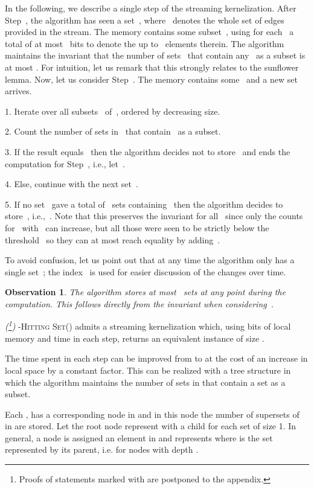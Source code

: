 \documentclass[draft,a4paper]{llncs}
\newtheorem{observation}{Observation}
\newcommand{\dHSk}{-\textsc{Hitting Set()}\xspace}
\begin{document}
In the following, we describe a single step of the streaming kernelization. After Step~, the algorithm has seen a set~, where~ denotes the whole set of edges provided in the stream. The memory contains some subset~, using for each~ a total of at most~ bits to denote the up to~ elements therein. The algorithm maintains the invariant that the number of sets~ that contain any~ as a subset is at most . For intuition, let us remark that this strongly relates to the sunflower lemma. Now, let us consider Step~. The memory contains some~ and a new set~ arrives.
\smallskip

1. Iterate over all subsets~ of~, ordered by decreasing size.

2. Count the number of sets in~ that contain~ as a subset.

3. If the result equals~ then the algorithm decides not to store~ and ends the computation for Step~, i.e., let~.
 
4. Else, continue with the next set~.
 
5. If no set~ gave a total of~ sets containing~ then the algorithm decides to store~, i.e.,~. Note that this preserves the invariant for all~ since only the counts for~ with~ can increase, but all those were seen to be strictly below the threshold~ so they can at most reach equality by adding~.

\smallskip
To avoid confusion, let us point out that at any time the algorithm only has a single set~; the index~ is used for easier discussion of the changes over time.

\begin{observation}\label{obs:dhs}
The algorithm stores at most~ sets at any point during the computation. This follows directly from the invariant when considering~.
\end{observation}

\begin{theorem}\label{thm:dhs} \emph{(\footnote{Proofs of statements marked with  are postponed to the appendix.})}
\dHSk admits a streaming kernelization which, using  bits of local memory and  time in each step, returns an equivalent instance of size .
\end{theorem}

The time spent in each step can be improved from  to  at the cost of an increase in local space
by a constant factor. This can be realized with a tree structure  in which the algorithm maintains the number of sets in  that contain a set  as a subset.

Each ,  has a corresponding node in  and in this node the number of supersets of  in  are stored. Let the root node represent  with a child for each set  of size 1. In general, a node is assigned an element in  and represents  where  is the set represented by its parent, i.e.  for nodes with depth . 
\end{document}
